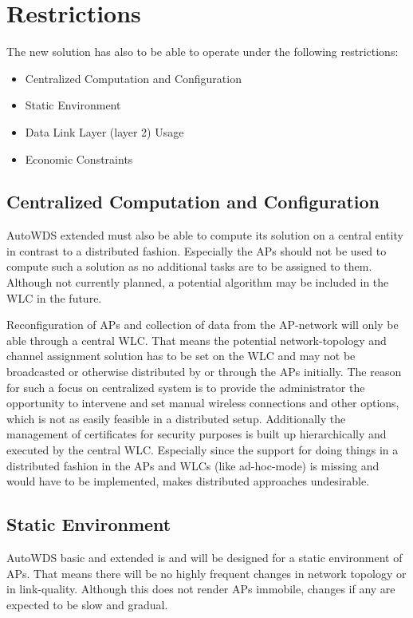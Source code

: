   \section{Restrictions}
    The new solution has also to be able to operate under the following restrictions:
    \begin{itemize}
     \item Centralized Computation and Configuration
     \item Static Environment
     \item Data Link Layer (layer 2) Usage
     \item Economic Constraints
    \end{itemize}
    
    \subsection{Centralized Computation and Configuration}
      AutoWDS extended must also be able to compute its solution on a central entity in contrast to a distributed fashion.
      Especially the APs should not be used to compute such a solution as no additional tasks are to be assigned to them.
      Although not currently planned, a potential algorithm may be included in the \ac{WLC} in the future.
      
      Reconfiguration of APs and collection of data from the \ac{AP}-network will only be able through a central \ac{WLC}.
      That means the potential network-topology and channel assignment solution has to be set on the \ac{WLC} and may not be broadcasted or otherwise
      distributed by or through the APs initially. The reason for such a focus on centralized system is to provide the administrator the 
      opportunity to intervene and set manual wireless connections and other options, which is not as easily feasible in a distributed setup. 
      Additionally the management of certificates for security purposes is built up hierarchically and executed by the central \ac{WLC}.
      Especially since the support for doing things in a distributed fashion in the APs and WLCs (like ad-hoc-mode) is missing and would have to be implemented, 
      makes distributed approaches undesirable.
      
    \subsection{Static Environment}
      AutoWDS basic and extended is and will be designed for a static environment of APs. That means there will be no highly frequent changes in
      network topology or in link-quality. Although this does not render APs immobile, changes if any are expected to be slow and gradual.
      
